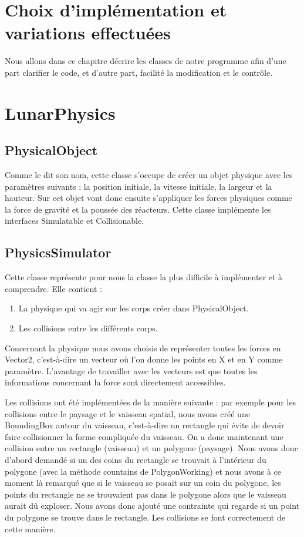 \section{Choix d'implémentation et variations effectuées}
Nous allons dans ce chapitre décrire les classes de notre programme afin d’une part clarifier le code, et d’autre part, facilité la modification et le contrôle.
\section{LunarPhysics}

\subsection{PhysicalObject}
Comme le dit son nom, cette classe s’occupe de créer un objet physique avec les paramètres suivants : la position initiale, la vitesse initiale, la largeur et la hauteur. Sur cet objet vont donc ensuite s’appliquer les forces physiques comme la force de gravité et la poussée des réacteurs. Cette classe implémente les interfaces Simulatable et Collisionable.

\subsection{PhysicsSimulator}
Cette classe représente pour nous la classe la plus difficile à implémenter et à comprendre. Elle contient :

\begin{enumerate}
\item La physique qui va agir sur les corps créer dans PhysicalObject.
\item Les collisions entre les différents corps.
\end{enumerate}

Concernant la physique nous avons choisis de représenter toutes les forces en Vector2, c’est-à-dire un vecteur où l’on donne les points en X et en Y comme paramètre. L’avantage de travailler avec les vecteurs est que toutes les informations concernant la force sont directement accessibles.

Les collisions ont été implémentées de la manière suivante : par exemple pour les collisions entre le paysage et le vaisseau spatial, nous avons créé une BoundingBox autour du vaisseau, c’est-à-dire un rectangle qui évite de devoir faire collisionner la forme compliquée du vaisseau. On a donc maintenant une collision entre un rectangle (vaisseau) et un polygone (paysage). Nous avons donc d’abord demandé si un des coins du rectangle se trouvait à l’intérieur du polygone (avec la méthode countains de PolygonWorking) et nous avons à ce moment là remarqué que si le vaisseau se posait sur un coin du polygone, les points du rectangle ne se trouvaient pas dans le polygone alors que le vaisseau aurait dû exploser. Nous avons donc ajouté une contrainte qui regarde si un point du polygone se trouve dans le rectangle. Les collisions se font correctement de cette manière.

